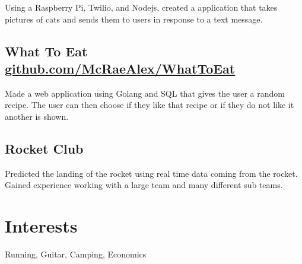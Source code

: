 \documentclass{article}
\begin{document}
Using a Raspberry Pi, Twilio, and Nodejs, created a application that takes 
pictures of cats and sends them to users in response to a text message.

\subsection{What To Eat \href{https://github.com/McRaeAlex/WhatToEat}{github.com/McRaeAlex/WhatToEat}}

Made a web application using Golang and SQL that gives the user a random recipe.
The user can then choose if they like that recipe or if they do not like it 
another is shown.


\subsection{Rocket Club}

Predicted the landing of the rocket using real time data coming from the rocket. 
Gained experience working with a large team and many different sub teams.

\section{Interests}

Running, Guitar, Camping, Economics
\end{document}
